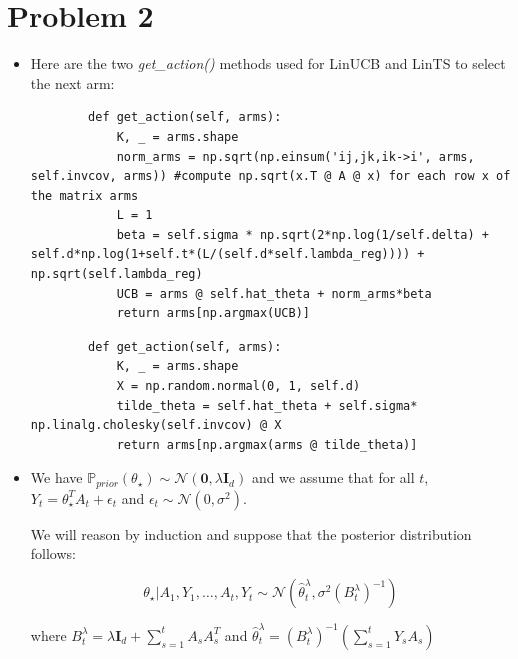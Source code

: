 \section{Problem 2}

\begin{itemize}
    \item Here are the two \textit{get\_action()} methods used for LinUCB and LinTS to select the next arm:

    \begin{verbatim}
        def get_action(self, arms):
            K, _ = arms.shape
            norm_arms = np.sqrt(np.einsum('ij,jk,ik->i', arms, self.invcov, arms)) #compute np.sqrt(x.T @ A @ x) for each row x of the matrix arms
            L = 1
            beta = self.sigma * np.sqrt(2*np.log(1/self.delta) + self.d*np.log(1+self.t*(L/(self.d*self.lambda_reg)))) + np.sqrt(self.lambda_reg)
            UCB = arms @ self.hat_theta + norm_arms*beta
            return arms[np.argmax(UCB)]
    \end{verbatim}
    \begin{verbatim}
        def get_action(self, arms):
            K, _ = arms.shape
            X = np.random.normal(0, 1, self.d)
            tilde_theta = self.hat_theta + self.sigma* np.linalg.cholesky(self.invcov) @ X
            return arms[np.argmax(arms @ tilde_theta)]
    \end{verbatim}


    \item We have $\mathbb{P}_{prior}(\theta_{\star}) \sim \mathcal{N}(\mathbf{0}, \lambda \mathbf{I}_d)$ and we assume that for all $t$, $Y_{t} = \theta_{\star}^TA_t + \epsilon_t$ and $\epsilon_t \sim \mathcal{N}(0, \sigma^2)$.

    We will reason by induction and suppose that the posterior distribution follows:

    \[
    \theta_{\star}|A_1, Y_1, \dots, A_t, Y_t \sim \mathcal{N}(\hat\theta_t^{\lambda}, \sigma^2{(B_t^{\lambda})}^{-1})
    \]

    where $B_t^{\lambda} = \lambda \mathbf{I}_d + \sum_{s=1}^t A_s A_s^T$ and $\hat\theta_t^{\lambda} = {(B_t^{\lambda})}^{-1} (\sum_{s=1}^t Y_s A_s)$


\end{itemize}
